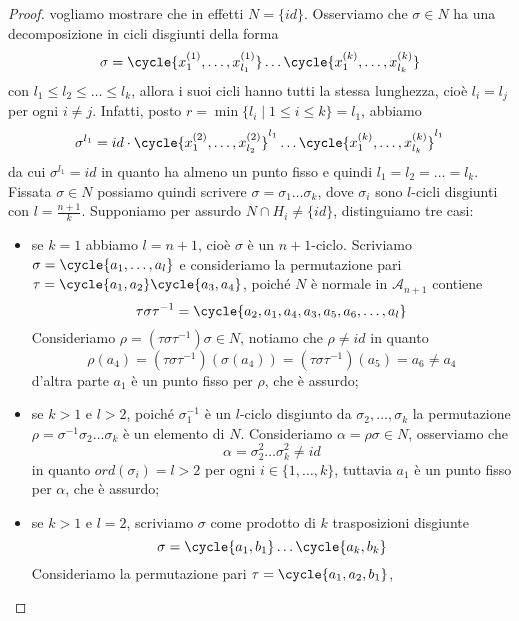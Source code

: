 \documentclass[11pt]{scrartcl}
\begin{document}
\begin{proof}
    vogliamo mostrare che in effetti $N = \{id\}$. Osserviamo che
    $\sigma \in N$ ha una decomposizione in cicli disgiunti
    della forma
    \[
        \sigma = \cycle{x_1^{(1)}, \ldots, x_{l_1}^{(1)}}\ldots\cycle{x_1^{(k)}, \ldots, x_{l_k}^{(k)}}
    \]
    con $l_1\leqslant l_2\leqslant \ldots\leqslant l_k$, allora i suoi cicli 
    hanno tutti la stessa lunghezza, cioè $l_i = l_j$ per ogni $i \neq j$.
    Infatti, posto $r = \min\{l_i\mid 1\leqslant i \leqslant k\} = l_1$, 
    abbiamo
    \[
        \sigma^{l_1} = id \cdot \cycle{x_1^{(2)}, \ldots, x_{l_2}^{(2)}}^{l_1}
        \ldots\cycle{x_1^{(k)}, \ldots, x_{l_k}^{(k)}}^{l_1}
    \]
    da cui $\sigma^{l_1} = id$ in quanto ha almeno un punto fisso e quindi 
    $l_1 = l_2 = \ldots = l_k$. Fissata $\sigma \in N$ possiamo quindi scrivere
    $\sigma = \sigma_1\ldots\sigma_k$,
    dove $\sigma_i$ sono $l$-cicli disgiunti con $l = \displaystyle\frac{n + 1}{k}$.
    Supponiamo per assurdo $N\cap H_i \neq \{id\}$, distinguiamo tre casi:
    \begin{itemize}
        \item se $k = 1$ abbiamo $l = n + 1$, cioè $\sigma$ è un $n + 1$-ciclo.
        Scriviamo $\sigma = \cycle{a_1, \ldots, a_l}$ e consideriamo la permutazione
        pari $\tau = \cycle{a_1, a_2}\cycle{a_3, a_4}$, poiché $N$ è normale in 
        $\mathcal{A}_{n + 1}$ contiene
        \[
            \tau\sigma\tau^{-1} = \cycle{a_2, a_1, a_4, a_3, a_5, a_6, \ldots, a_l}
        \]
        Consideriamo $\rho = (\tau\sigma\tau^{-1})\sigma \in N$, notiamo che
        $\rho \neq id$ in quanto
        \[
            \rho(a_4) = (\tau\sigma\tau^{-1})(\sigma(a_4)) = (\tau\sigma\tau^{-1})(a_5) = 
            a_6 \neq a_4
        \]
        d'altra parte $a_1$ è un punto fisso per $\rho$, che è assurdo;
        \item se $k > 1$ e $l > 2$, poiché $\sigma_1^{-1}$ è un $l$-ciclo
        disgiunto da $\sigma_2, \ldots, \sigma_k$ la permutazione 
        $\rho = \sigma^{-1}\sigma_2\ldots\sigma_k$ è un elemento di $N$. 
        Consideriamo $\alpha = \rho\sigma \in N$, osserviamo che 
        \[
            \alpha = \sigma_2^2\ldots\sigma_k^2 \neq id
        \]
        in quanto $ord(\sigma_i) = l > 2$ per ogni $i \in \{1, \ldots, k\}$,
        tuttavia $a_1$ è un punto fisso per $\alpha$, che è assurdo;
        \item se $k > 1$ e $l = 2$, scriviamo $\sigma$ come prodotto di $k$
        trasposizioni disgiunte
        \[
            \sigma = \cycle{a_1, b_1}\ldots\cycle{a_k, b_k}
        \]
        Consideriamo la permutazione pari $\tau = \cycle{a_1, a_2, b_1}$,

\end{itemize}
\end{proof}
\end{document}
